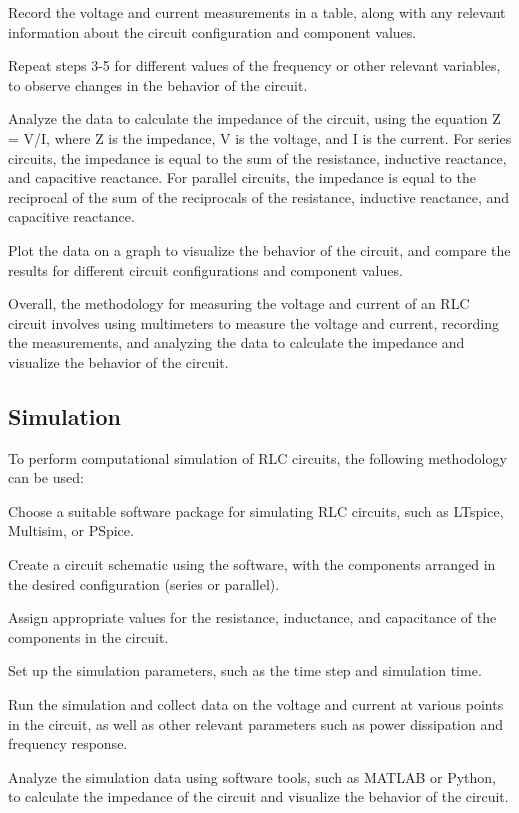 \documentclass[12pt,twoside]{extarticle}
\begin{document}
Record the voltage and current measurements in a table, along with any relevant information about the circuit configuration and component values.

Repeat steps 3-5 for different values of the frequency or other relevant variables, to observe changes in the behavior of the circuit.

Analyze the data to calculate the impedance of the circuit, using the equation Z = V/I, where Z is the impedance, V is the voltage, and I is the current. For series circuits, the impedance is equal to the sum of the resistance, inductive reactance, and capacitive reactance. For parallel circuits, the impedance is equal to the reciprocal of the sum of the reciprocals of the resistance, inductive reactance, and capacitive reactance.

Plot the data on a graph to visualize the behavior of the circuit, and compare the results for different circuit configurations and component values.

Overall, the methodology for measuring the voltage and current of an RLC circuit involves using multimeters to measure the voltage and current, recording the measurements, and analyzing the data to calculate the impedance and visualize the behavior of the circuit.

\subsection{Simulation}
To perform computational simulation of RLC circuits, the following methodology can be used:

Choose a suitable software package for simulating RLC circuits, such as LTspice, Multisim, or PSpice.

Create a circuit schematic using the software, with the components arranged in the desired configuration (series or parallel).

Assign appropriate values for the resistance, inductance, and capacitance of the components in the circuit.

Set up the simulation parameters, such as the time step and simulation time.

Run the simulation and collect data on the voltage and current at various points in the circuit, as well as other relevant parameters such as power dissipation and frequency response.

Analyze the simulation data using software tools, such as MATLAB or Python, to calculate the impedance of the circuit and visualize the behavior of the circuit.
\end{document}

